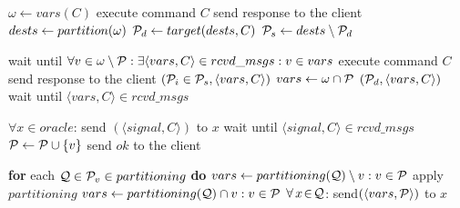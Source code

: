 \begin{algorithm}[h!]
\small

\begin{distribalgo}[1]

	\STATE $\omega \leftarrow vars(C)$
		\STATE execute command $C$
		\STATE send response to the client
		\STATE $dests \leftarrow partition(\omega)$
		\STATE $\mathcal{P}_d \leftarrow target(dests, C)$
		\STATE $\mathcal{P}_s \leftarrow dests \setminus \mathcal{P}_d$

			\STATE wait until $\forall v \in \omega \setminus \mathcal{P}: \exists \langle vars, C \rangle \in rcvd\_msgs :v \in vars$
			\STATE execute command $C$
			\STATE send response to the client
			\STATE \rmcast$(\mathcal{P}_i \in \mathcal{P}_s, \langle vars, C\rangle)$
			\STATE $vars \leftarrow \omega \cap \mathcal{P}$
			\STATE \rmcast$(\mathcal{P}_d, \langle vars, C \rangle)$
			\STATE wait until $\langle vars, C \rangle \in rcvd\_msgs$
		\ENDIF		
	\ENDIF
\ENDINDENT

\vspace{1.0mm}

\vspace{1.0mm}
	\STATE $\forall x \in oracle$: send $(\langle signal, C \rangle )$ to $x$
	\STATE wait until $\langle signal, C \rangle \in rcvd\_msgs$
	\STATE $\mathcal{P} \leftarrow \mathcal{P} \cup \{v\}$
	\STATE send $ok$ to the client
\ENDINDENT

\vspace{1.0mm}
	\STATE \textbf{for} each $\mathcal{Q} \in \mathcal{P}_v \in partitioning$ \textbf{do} 
			\STATE $vars \leftarrow partitioning(\mathcal{Q}) \setminus v:v \in \mathcal{P}$
				\STATE apply $partitioning$
			\ENDIF
		\ELSE 
			\STATE $vars \leftarrow partitioning(\mathcal{Q}) \cap v:v \in \mathcal{P}$
			\STATE $\forall\,x\!\in\!\mathcal{Q}$: send$(\langle vars, \mathcal{P} \rangle )$ to $x$
		\ENDIF
\ENDINDENT


\end{distribalgo}
\end{algorithm}
